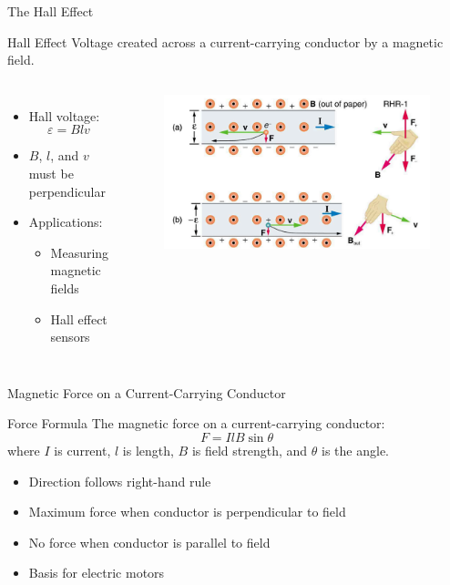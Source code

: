 \documentclass{beamer}
\begin{document}
\begin{frame}{The Hall Effect}
\begin{block}{Hall Effect}
Voltage created across a current-carrying conductor by a magnetic field.
\end{block}

\begin{columns}
\begin{itemize}
\item Hall voltage:
\begin{equation}
\varepsilon = Blv
\end{equation}
\item $B$, $l$, and $v$ must be perpendicular
\item Applications:
\begin{itemize}
\item Measuring magnetic fields
\item Hall effect sensors
\end{itemize}
\end{itemize}

\begin{figure}
\centering
\includegraphics[width=1\linewidth]{phys12-magnetism-hall-effect.png}
\end{figure}
\end{columns}
\end{frame}

\begin{frame}{Magnetic Force on a Current-Carrying Conductor}
\begin{block}{Force Formula}
The magnetic force on a current-carrying conductor:
\begin{equation}
F = IlB\sin\theta
\end{equation}
where $I$ is current, $l$ is length, $B$ is field strength, and $\theta$ is the angle.
\end{block}

\begin{itemize}
\item Direction follows right-hand rule
\item Maximum force when conductor is perpendicular to field
\item No force when conductor is parallel to field
\item Basis for electric motors
\end{itemize}
\end{frame}
\end{document}
